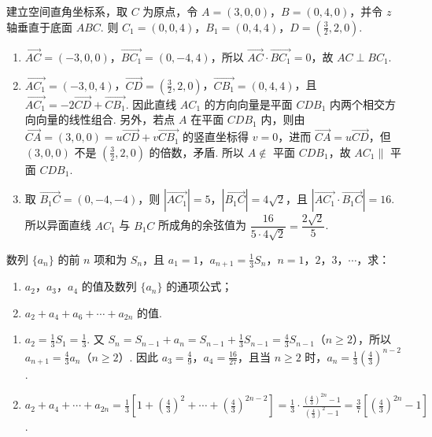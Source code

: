 \begin{solution}
建立空间直角坐标系，取 \(C\) 为原点，令 \(A=(3,0,0)\)，\(B=(0,4,0)\)，并令 \(z\) 轴垂直于底面 \(ABC\). 则 \(C_1=(0,0,4)\)，\(B_1=(0,4,4)\)，\(D=(\frac32,2,0)\).

\begin{enumerate}
\item \(\overrightarrow{AC}=(-3,0,0)\)，\(\overrightarrow{BC_1}=(0,-4,4)\)，所以 \(\overrightarrow{AC}\cdot\overrightarrow{BC_1}=0\)，故 \(AC\perp BC_1\).
\item \(\overrightarrow{AC_1}=(-3,0,4)\)，\(\overrightarrow{CD}=(\frac32,2,0)\)，\(\overrightarrow{CB_1}=(0,4,4)\)，且 \(\overrightarrow{AC_1}=-2\overrightarrow{CD}+\overrightarrow{CB_1}\). 因此直线 \(AC_1\) 的方向向量是平面 \(CDB_1\) 内两个相交方向向量的线性组合. 另外，若点 \(A\) 在平面 \(CDB_1\) 内，则由 \(\overrightarrow{CA}=(3,0,0)=u\overrightarrow{CD}+v\overrightarrow{CB_1}\) 的竖直坐标得 \(v=0\)，进而 \(\overrightarrow{CA}=u\overrightarrow{CD}\)，但 \((3,0,0)\) 不是 \((\frac32,2,0)\) 的倍数，矛盾. 所以 \(A\notin\) 平面 \(CDB_1\)，故 \(AC_1\parallel\) 平面 \(CDB_1\).
\item 取 \(\overrightarrow{B_1C}=(0,-4,-4)\)，则 \(|\overrightarrow{AC_1}|=5\)，\(|\overrightarrow{B_1C}|=4\sqrt2\)，且 \(\left|\overrightarrow{AC_1}\cdot\overrightarrow{B_1C}\right|=16\). 所以异面直线 \(AC_1\) 与 \(B_1C\) 所成角的余弦值为 \(\dfrac{16}{5\cdot4\sqrt2}=\dfrac{2\sqrt2}{5}\).
\end{enumerate}
\end{solution}

\begin{problem}
数列 \(\{a_n\}\) 的前 \(n\) 项和为 \(S_n\)，且 \(a_1=1\)，\(a_{n+1}=\frac{1}{3}S_n\)，\(n=1\)，\(2\)，\(3\)，\(\cdots\)，求：

\begin{enumerate}
\item \(a_2\)，\(a_3\)，\(a_4\) 的值及数列 \(\{a_n\}\) 的通项公式；
\item \(a_2+a_4+a_6+\cdots+a_{2n}\) 的值.
\end{enumerate}
\end{problem}

\begin{solution}
\begin{enumerate}
\item \(a_2=\frac13S_1=\frac13\). 又 \(S_n=S_{n-1}+a_n=S_{n-1}+\frac13S_{n-1}=\frac43S_{n-1}\)（\(n\geqslant2\)），所以 \(a_{n+1}=\frac43a_n\)（\(n\geqslant2\)）. 因此 \(a_3=\frac49\)，\(a_4=\frac{16}{27}\)，且当 \(n\geqslant2\) 时，\(a_n=\frac13\left(\frac43\right)^{n-2}\).
\item \(\displaystyle a_2+a_4+\cdots+a_{2n}=\frac13\left[1+\left(\frac43\right)^2+\cdots+\left(\frac43\right)^{2n-2}\right]=\frac13\cdot\frac{\left(\frac43\right)^{2n}-1}{\left(\frac43\right)^2-1}=\frac37\left[\left(\frac43\right)^{2n}-1\right]\).
\end{enumerate}
\end{solution}


